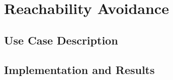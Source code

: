 \section{Reachability Avoidance}
\subsection{Use Case Description}
\subsection{Implementation and Results}

